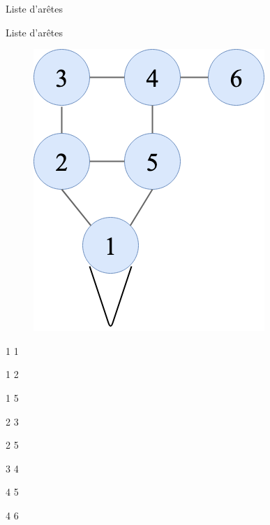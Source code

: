 \documentclass[10pt,xcolor=dvipsnames]{beamer}
\begin{document}
\begin{frame}{Liste d'arêtes}
    \begin{exampleblock}{Liste d'arêtes}
        \begin{minipage}{0.6\textwidth}
    \begin{figure}
        \centering
        \includegraphics[scale=0.3]{figures/CM3/adj-matrix.png}
        \label{fig:my_label}
    \end{figure}
    \end{minipage}
    \begin{minipage}{0.35\textwidth}
    \begin{description}
        \item 1 1
        \item 1 2
        \item 1 5
        \item 2 3
        \item 2 5
        \item 3 4
        \item 4 5
        \item 4 6
    \end{description}
    \end{minipage}
    \end{exampleblock}
\end{frame}
\end{document}
